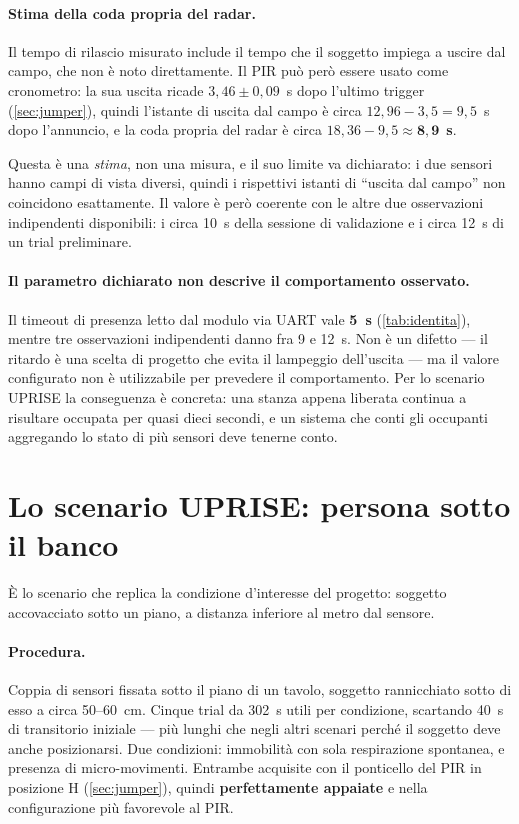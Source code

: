 \paragraph{Stima della coda propria del radar.} Il tempo di rilascio misurato include
il tempo che il soggetto impiega a uscire dal campo, che non è noto direttamente. Il
PIR può però essere usato come cronometro: la sua uscita ricade $3{,}46 \pm 0{,}09$~s
dopo l'ultimo trigger (\cref{sec:jumper}), quindi l'istante di uscita dal campo è
circa $12{,}96 - 3{,}5 = 9{,}5$~s dopo l'annuncio, e la coda propria del radar è circa
$18{,}36 - 9{,}5 \approx \mathbf{8{,}9}$~\textbf{s}.

Questa è una \emph{stima}, non una misura, e il suo limite va dichiarato: i due
sensori hanno campi di vista diversi, quindi i rispettivi istanti di ``uscita dal
campo'' non coincidono esattamente. Il valore è però coerente con le altre due
osservazioni indipendenti disponibili: i circa 10~s della sessione di validazione e i
circa 12~s di un trial preliminare.

\paragraph{Il parametro dichiarato non descrive il comportamento osservato.} Il
timeout di presenza letto dal modulo via UART vale \textbf{5~s}
(\cref{tab:identita}), mentre tre osservazioni indipendenti danno fra 9 e 12~s. Non è
un difetto --- il ritardo è una scelta di progetto che evita il lampeggio dell'uscita
--- ma il valore configurato non è utilizzabile per prevedere il comportamento. Per
lo scenario UPRISE la conseguenza è concreta: una stanza appena liberata continua a
risultare occupata per quasi dieci secondi, e un sistema che conti gli occupanti
aggregando lo stato di più sensori deve tenerne conto.

\section{Lo scenario UPRISE: persona sotto il banco}
\label{sec:sotto-banco}

È lo scenario che replica la condizione d'interesse del progetto: soggetto
accovacciato sotto un piano, a distanza inferiore al metro dal sensore.

\paragraph{Procedura.} Coppia di sensori fissata sotto il piano di un tavolo, soggetto
rannicchiato sotto di esso a circa 50--60~cm. Cinque trial da 302~s utili per
condizione, scartando 40~s di transitorio iniziale --- più lunghi che negli altri
scenari perché il soggetto deve anche posizionarsi. Due condizioni: immobilità con
sola respirazione spontanea, e presenza di micro-movimenti. Entrambe acquisite con il
ponticello del PIR in posizione H (\cref{sec:jumper}), quindi \textbf{perfettamente
appaiate} e nella configurazione più favorevole al PIR.

